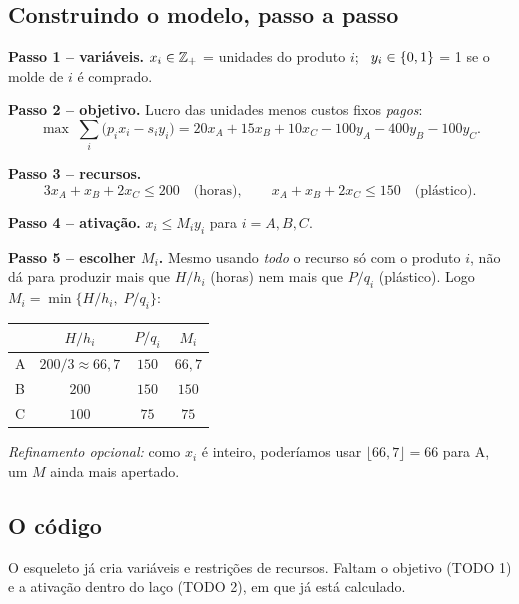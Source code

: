 \subsection*{Construindo o modelo, passo a passo}

\textbf{Passo 1 -- variáveis.} $x_i\in\mathbb{Z}_+$ = unidades do produto $i$; \ $y_i\in\{0,1\}$ = 1 se o molde de $i$ é
comprado.

\textbf{Passo 2 -- objetivo.} Lucro das unidades menos custos fixos \emph{pagos}:
\[
\max\;\sum_i \big(p_i x_i - s_i y_i\big) = 20x_A+15x_B+10x_C-100y_A-400y_B-100y_C.
\]

\textbf{Passo 3 -- recursos.}
\[
3x_A + x_B + 2x_C \le 200\quad\text{(horas)},\qquad x_A+x_B+2x_C\le150\quad\text{(plástico)}.
\]

\textbf{Passo 4 -- ativação.} $x_i\le M_iy_i$ para $i=A,B,C$.

\textbf{Passo 5 -- escolher $M_i$.} Mesmo usando \emph{todo} o recurso só com o produto $i$, não dá para produzir mais
que $H/h_i$ (horas) nem mais que $P/q_i$ (plástico). Logo $M_i=\min\{H/h_i,\;P/q_i\}$:
\begin{center}
\begin{tabular}{lccc}
\toprule
& $H/h_i$ & $P/q_i$ & $M_i$\\
\midrule
A & $200/3\approx66{,}7$ & $150$ & $66{,}7$\\
B & $200$ & $150$ & $150$\\
C & $100$ & $75$ & $75$\\
\bottomrule
\end{tabular}
\end{center}
\emph{Refinamento opcional:} como $x_i$ é inteiro, poderíamos usar $\lfloor 66{,}7\rfloor=66$ para A, um
$M$ ainda mais apertado.

\subsection*{O código}

O esqueleto já cria variáveis e restrições de recursos. Faltam o objetivo (TODO 1) e a ativação dentro do laço
(TODO 2), em que  já está calculado.

